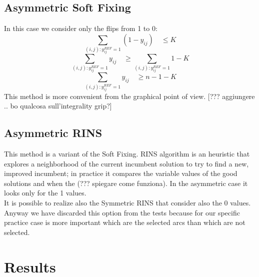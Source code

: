 \subsection{Asymmetric Soft Fixing}
In this case we consider only the flips from 1 to 0:
\[
	\sum_{(i,j):y^{REF}_{ij}=1} (1-y_{ij}) \quad \leq K
\]
\[
	\sum_{(i,j):y^{REF}_{ij}=1} y_{ij} \quad \geq \sum_{(i,j):y^{REF}_{ij}=1} 1 - K
\]
\[
	\sum_{(i,j):y^{REF}_{ij}=1} y_{ij} \quad \geq n - 1 - K
\]
This method is more convenient from the graphical point of view. 
[??? aggiungere .. bo qualcosa sull'integrality grip?]
\subsection{Asymmetric RINS}
This method is a variant of the Soft Fixing. RINS algorithm is an heuristic that explores a neighborhood of the current incumbent solution to try to find a new, improved incumbent; in practice it compares the variable values of the good solutions and when the (??? spiegare come funziona). In the asymmetric case it looks only for the 1 values. \\
It is possible to realize also the Symmetric RINS that consider also the 0 values. Anyway we have discarded this option from the tests because for our specific practice case is more important which are the selected arcs than which are not selected.
\section{Results}


